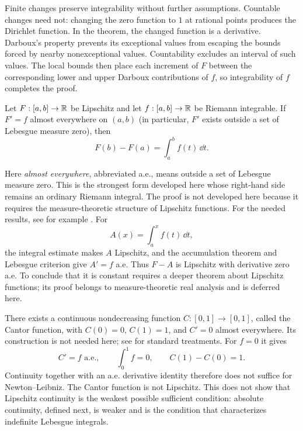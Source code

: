 Finite changes preserve integrability without further assumptions.
Countable changes need not: changing the zero function to $1$ at rational
points produces the Dirichlet function. In the theorem, the changed
function is a derivative. Darboux's property prevents its exceptional
values from escaping the bounds forced by nearby nonexceptional values.
Countability excludes an interval of such values. The local bounds then
place each increment of $F$ between the corresponding lower and upper
Darboux contributions of $f$, so integrability of $f$ completes the proof.

\begin{theorem}
\label{thm:ftc-lipschitz-ae}
Let $F:[a,b]\to\mathbb{R}$ be Lipschitz and let $f:[a,b]\to\mathbb{R}$ be Riemann
integrable. If $F'=f$ almost everywhere on $(a,b)$ (in particular, $F'$ exists
outside a set of Lebesgue measure zero), then
\[
\boxed{F(b)-F(a)=\int_a^b f(t)\,\dd t.}
\]
\end{theorem}
Here \emph{almost everywhere}, abbreviated a.e., means outside a
set of Lebesgue measure zero. This is the strongest form developed here whose
right-hand side remains an ordinary Riemann integral.
The proof is not developed here because it requires the measure-theoretic
structure of Lipschitz functions. For the needed results, see for example
\cite{pugh-analysis,rudin-pma}.
For
\[
A(x)=\int_a^x f(t)\,\dd t,
\]
the integral estimate makes $A$ Lipschitz, and
the accumulation theorem and Lebesgue criterion give $A'=f$ a.e.
Thus $F-A$ is Lipschitz with derivative zero a.e. To conclude that it is
constant requires a deeper theorem about Lipschitz functions; its proof
belongs to measure-theoretic real analysis and is deferred here.

\begin{remark}
\label{rem:cantor-ftc-warning}
There exists a continuous nondecreasing function $C:[0,1]\to[0,1]$,
called the Cantor function, with $C(0)=0$, $C(1)=1$, and $C'=0$ almost
everywhere. Its construction is not needed here; see
\cite{abbott-analysis,pugh-analysis} for standard treatments. For $f=0$ it gives
\[
C'=f\text{ a.e.},\qquad \int_0^1 f=0,
\qquad C(1)-C(0)=1.
\]
Continuity together with an a.e. derivative identity therefore does not
suffice for Newton--Leibniz. The Cantor function is not Lipschitz.
This does not show that Lipschitz continuity is the weakest possible
sufficient condition: absolute continuity, defined next, is weaker and
is the condition that characterizes indefinite Lebesgue integrals.
\end{remark}


